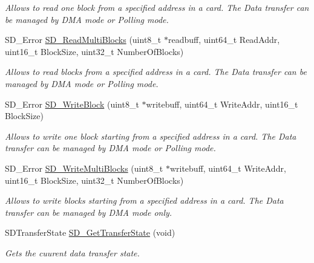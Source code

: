 \begin{DoxyCompactItemize}
\begin{DoxyCompactList}\small\item\em Allows to read one block from a specified address in a card. The Data transfer can be managed by D\+MA mode or Polling mode. \end{DoxyCompactList}\item 
S\+D\+\_\+\+Error \hyperlink{group___s_t_m324x_g___e_v_a_l___s_d_i_o___s_d___exported___functions_ga56b7336165f2631d9142a513ea2d0d17}{S\+D\+\_\+\+Read\+Multi\+Blocks} (uint8\+\_\+t $\ast$readbuff, uint64\+\_\+t Read\+Addr, uint16\+\_\+t Block\+Size, uint32\+\_\+t Number\+Of\+Blocks)
\begin{DoxyCompactList}\small\item\em Allows to read blocks from a specified address in a card. The Data transfer can be managed by D\+MA mode or Polling mode. \end{DoxyCompactList}\item 
S\+D\+\_\+\+Error \hyperlink{group___s_t_m324x_g___e_v_a_l___s_d_i_o___s_d___exported___functions_gab1eef7c1ff23ea746db504463d301a8b}{S\+D\+\_\+\+Write\+Block} (uint8\+\_\+t $\ast$writebuff, uint64\+\_\+t Write\+Addr, uint16\+\_\+t Block\+Size)
\begin{DoxyCompactList}\small\item\em Allows to write one block starting from a specified address in a card. The Data transfer can be managed by D\+MA mode or Polling mode. \end{DoxyCompactList}\item 
S\+D\+\_\+\+Error \hyperlink{group___s_t_m324x_g___e_v_a_l___s_d_i_o___s_d___exported___functions_ga64baac72a75a2c522e837935009cbe93}{S\+D\+\_\+\+Write\+Multi\+Blocks} (uint8\+\_\+t $\ast$writebuff, uint64\+\_\+t Write\+Addr, uint16\+\_\+t Block\+Size, uint32\+\_\+t Number\+Of\+Blocks)
\begin{DoxyCompactList}\small\item\em Allows to write blocks starting from a specified address in a card. The Data transfer can be managed by D\+MA mode only. \end{DoxyCompactList}\item 
S\+D\+Transfer\+State \hyperlink{group___s_t_m324x_g___e_v_a_l___s_d_i_o___s_d___exported___functions_ga2dd79455185c28bd21964d113a38d110}{S\+D\+\_\+\+Get\+Transfer\+State} (void)
\begin{DoxyCompactList}\small\item\em Gets the cuurent data transfer state. \end{DoxyCompactList}\item 

\end{DoxyCompactItemize}
